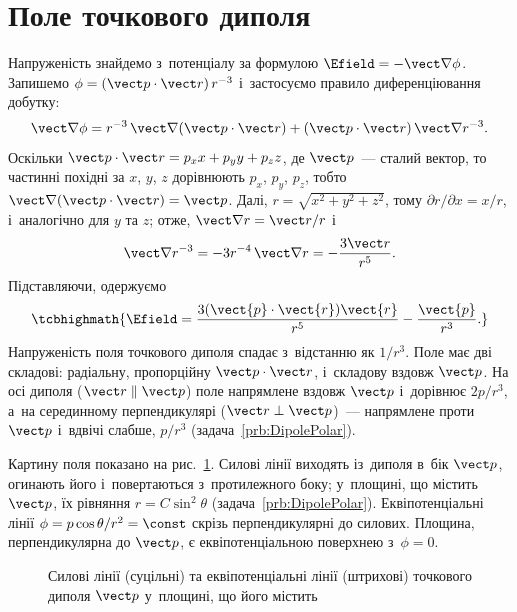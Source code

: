 \section{Поле точкового диполя}\label{sec:DipoleField}\hypertarget{point-dipole-field}{}

Напруженість знайдемо з~потенціалу за формулою $\Efield=-\vect\nabla\phi$. Запишемо
$\phi=(\vect p\cdot\vect r)\,r^{-3}$ і~застосуємо правило диференціювання добутку:
\begin{equation*}
	\vect\nabla\phi=r^{-3}\,\vect\nabla(\vect p\cdot\vect r)+(\vect p\cdot\vect r)\,\vect\nabla r^{-3}.
\end{equation*}
Оскільки $\vect p\cdot\vect r=p_x x+p_y y+p_z z$, де $\vect p$~--- сталий вектор, то частинні
похідні за $x$, $y$, $z$ дорівнюють $p_x$, $p_y$, $p_z$, тобто $\vect\nabla(\vect p\cdot\vect
r)=\vect p$. Далі, $r=\sqrt{x^2+y^2+z^2}$, тому $\partial r/\partial x=x/r$, і~аналогічно для
$y$ та $z$; отже, $\vect\nabla r=\vect r/r$ і
\begin{equation*}
	\vect\nabla r^{-3}=-3r^{-4}\,\vect\nabla r=-\frac{3\vect r}{r^5}.
\end{equation*}
Підставляючи, одержуємо
\begin{equation}\label{eq:dipole_field}
	\tcbhighmath{
		\Efield = \frac{3(\vect{p}\cdot\vect{r})\vect{r}}{r^5} -
		\frac{\vect{p}}{r^3}.
	}
\end{equation}
Напруженість поля точкового диполя спадає з~відстанню як $1/r^3$. Поле має дві складові:
радіальну, пропорційну $\vect p\cdot\vect r$, і~складову вздовж $\vect p$. На осі диполя
($\vect r\parallel\vect p$) поле напрямлене вздовж $\vect p$ і~дорівнює $2p/r^3$, а~на
серединному перпендикулярі ($\vect r\perp\vect p$)~--- напрямлене проти $\vect p$ і~вдвічі
слабше, $p/r^3$ (задача~\ref{prb:DipolePolar}).

Картину поля показано на рис.~\ref{tikz:dipole_lines}. Силові лінії виходять із~диполя
в~бік $\vect p$, огинають його і~повертаються з~протилежного боку; у~площині, що містить
$\vect p$, їх рівняння $r = C\sin^2\theta$ (задача~\ref{prb:DipolePolar}). Еквіпотенціальні
лінії $\phi = p\cos\theta/r^2 = \const$ скрізь перпендикулярні до силових. Площина,
перпендикулярна до $\vect p$, є еквіпотенціальною поверхнею з~$\phi = 0$.

\begin{figure}[tbp]
	\centering
	\caption{Силові лінії (суцільні) та еквіпотенціальні лінії (штрихові) точкового
		диполя $\vect p$ у~площині, що його містить}
	\label{tikz:dipole_lines}
\end{figure}

